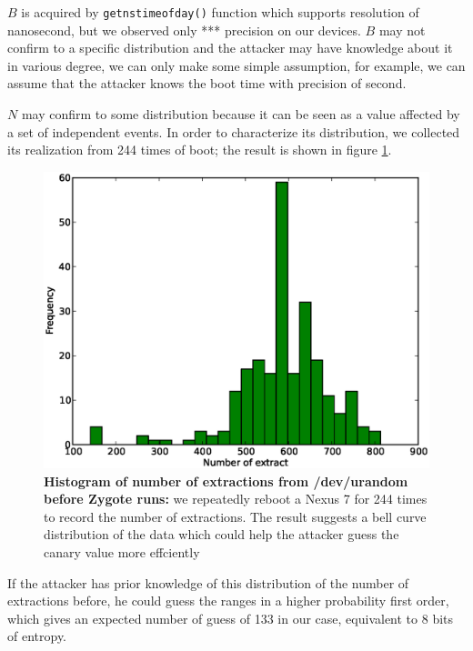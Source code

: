 $B$ is acquired by \verb|getnstimeofday()| function which supports resolution of nanosecond, but we observed only *** precision on our devices. 
$B$ may not confirm to a specific distribution and the attacker may have knowledge about it in various degree, we can only make some simple assumption, for example, we can assume that the attacker knows the boot time with precision of second.

$N$ may confirm to some distribution because it can be seen as a value affected by a set of independent events. In order to characterize its distribution, we collected its realization from 244 times of boot; the result is shown in figure \ref{fighist}.

\begin{figure}[t]
\begin{center}
\includegraphics[scale=0.4]{hist.eps}
\end{center}
\caption{{\bf Histogram of number of extractions from /dev/urandom before Zygote runs:} we repeatedly reboot a Nexus 7 for 244 times to record the number of extractions. The result suggests a bell curve distribution of the data which could help the attacker guess the canary value more effciently }
\label{fighist}
\end{figure}

If the attacker has prior knowledge of this distribution of the number of extractions before, he could guess the ranges in a higher probability first order, which gives an expected number of guess of 133 in our case, equivalent to 8 bits of entropy.


